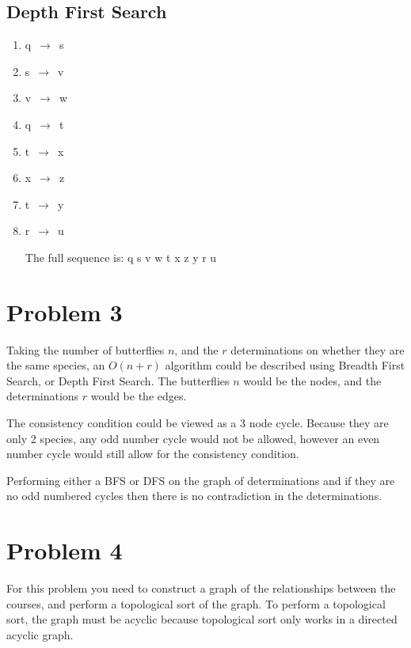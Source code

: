 \documentclass{article}
\begin{document}
\subsection{Depth First Search}
\begin{enumerate}
\item q $\, \to\,$ s
\item s $\, \to\,$ v
\item v $\, \to\,$ w
\item q $\, \to\,$ t
\item t $\, \to\,$ x
\item x $\, \to\,$ z
\item t $\, \to\,$ y
\item r $\, \to\,$ u

  The full sequence is: q s v w t x z y r u

\end{enumerate}


\section*{Problem 3}

Taking the number of butterflies $n$, and the $r$ determinations on whether they are the same
species, an $O(n + r)$ algorithm could be described using Breadth First Search, or Depth First
Search. The butterflies $n$ would be the nodes, and the determinations $r$ would be the edges.

The consistency condition could be viewed as a 3 node cycle. Because they are only 2 species, any odd number cycle would not be allowed, however an even number cycle would still allow for the consistency condition.

Performing either a BFS or DFS on the graph of determinations and if they are no odd numbered cycles then there is no contradiction in the determinations.

\section*{Problem 4}

For this problem you need to construct a graph of the relationships between the courses, and
perform a topological sort of the graph. To perform a topological sort, the graph must be acyclic
because topological sort only works in a directed acyclic graph.
\end{document}
